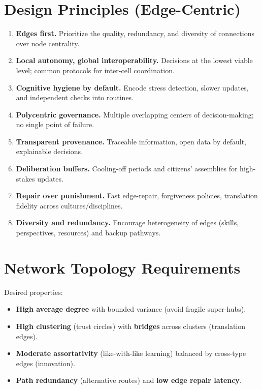 \documentclass[11pt,a4paper]{article}
\begin{document}
\section{Design Principles (Edge-Centric)}
\begin{enumerate}[label=\textbf{P\arabic*.}]
  \item \textbf{Edges first.} Prioritize the quality, redundancy, and diversity of connections over node centrality.
  \item \textbf{Local autonomy, global interoperability.} Decisions at the lowest viable level; common protocols for inter-cell coordination.
  \item \textbf{Cognitive hygiene by default.} Encode stress detection, slower updates, and independent checks into routines.
  \item \textbf{Polycentric governance.} Multiple overlapping centers of decision-making; no single point of failure.
  \item \textbf{Transparent provenance.} Traceable information, open data by default, explainable decisions.
  \item \textbf{Deliberation buffers.} Cooling-off periods and citizens' assemblies for high-stakes updates.
  \item \textbf{Repair over punishment.} Fast edge-repair, forgiveness policies, translation fidelity across cultures/disciplines.
  \item \textbf{Diversity and redundancy.} Encourage heterogeneity of edges (skills, perspectives, resources) and backup pathways.
\end{enumerate}

\section{Network Topology Requirements}
Desired properties:
\begin{itemize}
  \item \textbf{High average degree} with bounded variance (avoid fragile super-hubs).
  \item \textbf{High clustering} (trust circles) with \textbf{bridges} across clusters (translation edges).
  \item \textbf{Moderate assortativity} (like-with-like learning) balanced by cross-type edges (innovation).
  \item \textbf{Path redundancy} (alternative routes) and \textbf{low edge repair latency}.
\end{itemize}
\end{document}
